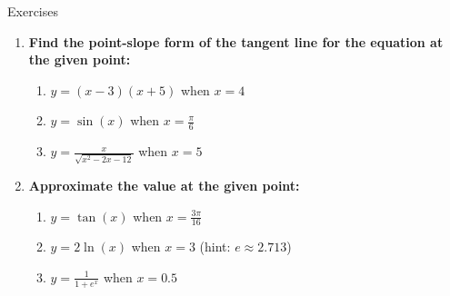 \documentclass[../revisedmain.tex]{subfiles}
\begin{document}
\begin{center}
	\LARGE{Exercises}
\end{center}
\begin{enumerate}
	\item \textbf{Find the point-slope form of the tangent line for the equation at the given point:}
	\begin{enumerate}
		\item $y=(x-3)(x+5)$ when $x=4$
		\item $y=\sin(x)$ when $x=\frac{\pi}{6}$
		\item $y=\displaystyle\frac{x}{\sqrt{x^2-2x-12}}$ when $x=5$ 
	\end{enumerate}
	\item \textbf{Approximate the value at the given point:}
	\begin{enumerate}
		\item $y=\tan(x)$ when $x=\displaystyle\frac{3\pi}{16}$
		\item $y=2\ln(x)$ when $x=3$ \qquad(hint: $e\approx2.713$)
		\item $y=\displaystyle\frac{1}{1+e^{x}}$ when $x=0.5$
	\end{enumerate}
\end{enumerate}
\end{document}
